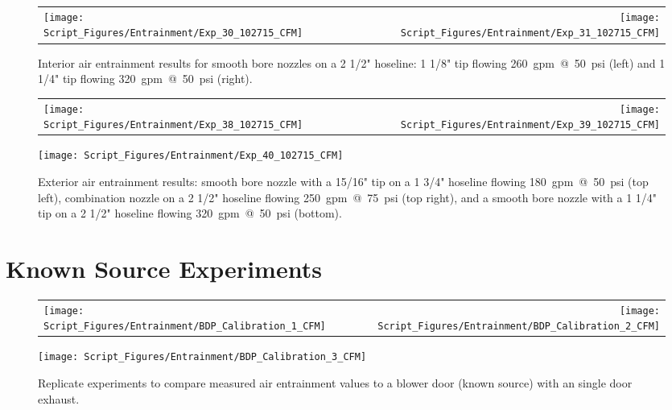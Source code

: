 \documentclass[12pt,oneside]{book}
\begin{document}
\clearpage

\begin{figure}[!ht]
\begin{tabular*}{\textwidth}{lr}
\texttt{[image: Script\_Figures/Entrainment/Exp\_30\_102715\_CFM]} &
\texttt{[image: Script\_Figures/Entrainment/Exp\_31\_102715\_CFM]} \\
\end{tabular*}
\caption[Air Entrainment for 2~1/2~in. Hoseline with Smooth Bore Nozzle from Interior]{Interior air entrainment results for smooth bore nozzles on a 2 1/2" hoseline: 1 1/8" tip flowing 260~gpm~@~50~psi (left) and 1 1/4" tip flowing 320~gpm~@~50~psi (right).}
\label{fig:2_5_Interior_Smooth_Bore}
\end{figure}

\clearpage

\begin{figure}[!ht]
\begin{tabular*}{\textwidth}{lr}
\texttt{[image: Script\_Figures/Entrainment/Exp\_38\_102715\_CFM]} &
\texttt{[image: Script\_Figures/Entrainment/Exp\_39\_102715\_CFM]} \\
\end{tabular*}
\centering
\texttt{[image: Script\_Figures/Entrainment/Exp\_40\_102715\_CFM]} 
\caption[Air Entrainment for 2~1/2~in. Hoseline with Smooth Bore Nozzle from Exterior]{Exterior air entrainment results: smooth bore nozzle with a 15/16" tip on a 1 3/4" hoseline flowing 180~gpm~@~50~psi (top left), combination nozzle on a 2 1/2" hoseline flowing 250~gpm~@~75~psi (top right), and a smooth bore nozzle with a 1 1/4" tip on a 2 1/2" hoseline flowing 320~gpm~@~50~psi (bottom).}
\label{fig:Exterior_Tests}
\end{figure}

\chapter{Known Source Experiments}
\label{app:CFM_tests}

\begin{figure}[!ht]
\begin{tabular*}{\textwidth}{lr}
\texttt{[image: Script\_Figures/Entrainment/BDP\_Calibration\_1\_CFM]} &
\texttt{[image: Script\_Figures/Entrainment/BDP\_Calibration\_2\_CFM]} \\
\end{tabular*}
\centering
\texttt{[image: Script\_Figures/Entrainment/BDP\_Calibration\_3\_CFM]} 
\caption[Air Entrainment with Known Source: Blower Door Test with Single Door Exhaust]{Replicate experiments to compare measured air entrainment values to a blower door (known source) with an single door exhaust.}
\label{fig:blower_single_door}
\end{figure}
\end{document}
